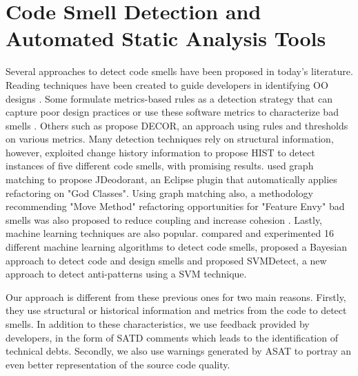 \section{Code Smell Detection and Automated Static Analysis Tools}

Several approaches to detect code smells have been proposed in today's literature. Reading techniques have been created to guide developers in identifying \ac{OO} designs \citep{Travassos99-ACM-Inspections}. Some formulate metrics-based rules as a detection strategy that can capture poor design practices \citep{Marinescu04-ICSM-DetectionStrategies} or use these software metrics to characterize bad smells \citep{Munro05-BadSmellIdentification}. Others such as \citet{moha2010decor} propose \ac{DECOR}, an approach using rules and thresholds on various metrics. Many detection techniques rely on structural information, however, \citet{PalombaBPOPL15} exploited change history information to propose \ac{HIST} to detect instances of five different code smells, with promising results. \citet{FokaefsTSC11} used graph matching to propose JDeodorant, an Eclipse plugin that automatically applies refactoring on "God Classes". Using graph matching also, a methodology recommending "Move Method" refactoring opportunities for "Feature Envy" bad smells was also proposed to reduce coupling and increase cohesion \citep{Tsantalis:tse2009}. Lastly, machine learning techniques are also popular. \citet{fontana2016comparing} compared and experimented 16 different machine learning algorithms to detect code smells, \citet{khomh2009bayesian} proposed a Bayesian approach to detect code and design smells and \citet{maiga2012support} proposed SVMDetect, a new approach to detect anti-patterns using a \ac{SVM} technique. \par 

Our approach is different from these previous ones for two main reasons. Firstly, they use structural or historical information and metrics from the code to detect smells. In addition to these characteristics, we use feedback provided by developers, in the form of \ac{SATD} comments which leads to the identification of technical debts. Secondly, we also use warnings generated by \ac{ASAT} to portray an even better representation of the source code quality. \par 

